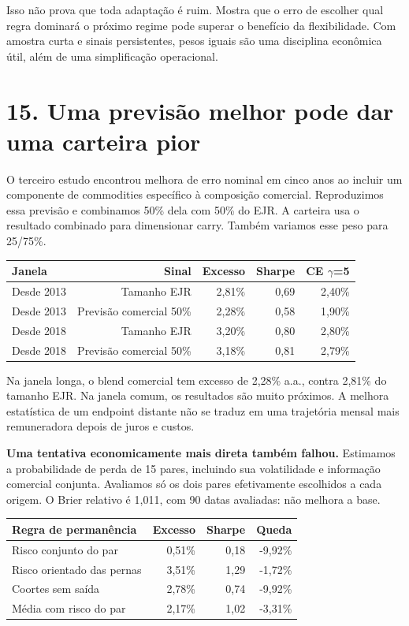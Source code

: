 \documentclass[11pt,a4paper]{article}
\begin{document}
Isso não prova que toda adaptação é ruim. Mostra que o erro de escolher qual regra dominará o próximo regime pode superar o benefício da flexibilidade. Com amostra curta e sinais persistentes, pesos iguais são uma disciplina econômica útil, além de uma simplificação operacional.

\clearpage
\section*{15. Uma previsão melhor pode dar uma carteira pior}

O terceiro estudo encontrou melhora de erro nominal em cinco anos ao incluir um componente de commodities específico à composição comercial. Reproduzimos essa previsão e combinamos 50\% dela com 50\% do EJR. A carteira usa o resultado combinado para dimensionar carry. Também variamos esse peso para 25/75\%.
\small\begin{center}\begin{tabular}{lrrrr}\toprule Janela & Sinal & Excesso & Sharpe & CE $\gamma$=5\\\midrule 
Desde 2013 & Tamanho EJR & 2,81\% & 0,69 & 2,40\%\\
Desde 2013 & Previsão comercial 50\% & 2,28\% & 0,58 & 1,90\%\\
Desde 2018 & Tamanho EJR & 3,20\% & 0,80 & 2,80\%\\
Desde 2018 & Previsão comercial 50\% & 3,18\% & 0,81 & 2,79\%\\\bottomrule\end{tabular}\end{center}\normalsize

Na janela longa, o blend comercial tem excesso de 2,28\% a.a., contra 2,81\% do tamanho EJR. Na janela comum, os resultados são muito próximos. A melhora estatística de um endpoint distante não se traduz em uma trajetória mensal mais remuneradora depois de juros e custos.

\textbf{Uma tentativa economicamente mais direta também falhou.} Estimamos a probabilidade de perda de 15 pares, incluindo sua volatilidade e informação comercial conjunta. Avaliamos só os dois pares efetivamente escolhidos a cada origem. O Brier relativo é 1,011, com 90 datas avaliadas: não melhora a base.
\small\begin{center}\begin{tabular}{lrrr}\toprule Regra de permanência & Excesso & Sharpe & Queda\\\midrule 
Risco conjunto do par & 0,51\% & 0,18 & -9,92\%\\
Risco orientado das pernas & 3,51\% & 1,29 & -1,72\%\\
Coortes sem saída & 2,78\% & 0,74 & -9,92\%\\
Média com risco do par & 2,17\% & 1,02 & -3,31\%\\\bottomrule\end{tabular}\end{center}\normalsize
\end{document}
